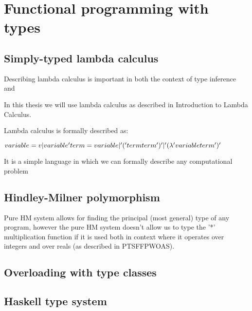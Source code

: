 \chapter{Functional programming with types}


\section{Simply-typed lambda calculus}

Describing lambda calculus is important in both the context of type inference and

In this thesis we will use lambda calculus as described in Introduction to Lambda Calculus.  %

Lambda calculus is formally described as:

$
    variable = v | variable' \\
    term = variable | '(' term term ')' |  '(\lambda' variable term ')'
$

It is a simple language in which we can formally describe any computational problem


\section{Hindley-Milner polymorphism}

Pure HM system allows for finding the principal (most general) type of any program, however
the pure HM system doesn't allow us to type the '*' multiplication function if it is used both
in context where it operates over integers and over reals (as described in PTSFFPWOAS). %


\section{Overloading with type classes}






\section{Haskell type system}


